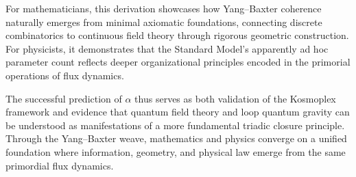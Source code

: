 \documentclass[pdflatex,sn-mathphys-num]{sn-jnl}
\theoremstyle{thmstyleone}
\theoremstyle{thmstyletwo}
\theoremstyle{thmstylethree}
\begin{document}
For mathematicians, this derivation showcases how Yang--Baxter coherence naturally emerges from minimal axiomatic foundations, connecting discrete combinatorics to continuous field theory through rigorous geometric construction. For physicists, it demonstrates that the Standard Model's apparently ad hoc parameter count reflects deeper organizational principles encoded in the primorial operations of flux dynamics.

The successful prediction of $\alpha$ thus serves as both validation of the Kosmoplex framework and evidence that quantum field theory and loop quantum gravity can be understood as manifestations of a more fundamental triadic closure principle. Through the Yang--Baxter weave, mathematics and physics converge on a unified foundation where information, geometry, and physical law emerge from the same primordial flux dynamics.

\pagebreak
\end{document}
